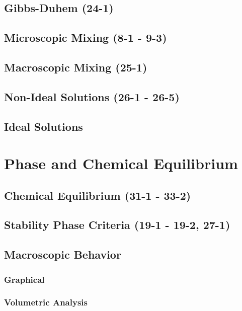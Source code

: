 \documentclass{mitqualif}
\begin{document}
\subsection{Gibbs-Duhem (24-1)}

\subsection{Microscopic Mixing (8-1 - 9-3)}





\subsection{Macroscopic Mixing (25-1)}

\subsection{Non-Ideal Solutions (26-1 - 26-5)}





\subsection{Ideal Solutions}
\section{Phase and Chemical Equilibrium}
\subsection{Chemical Equilibrium (31-1 - 33-2)}







\subsection{Stability Phase Criteria (19-1 - 19-2, 27-1)}



\subsection{Macroscopic Behavior}
\subsubsection{Graphical}
\subsubsection{Volumetric Analysis}






\end{document}
